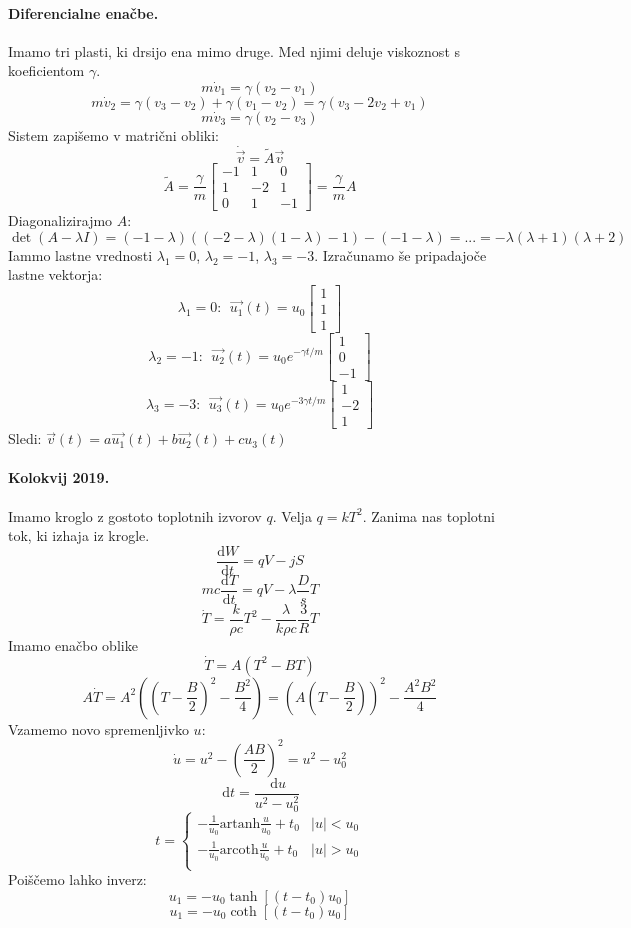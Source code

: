 \documentclass[a4paper]{article}
\newcommand{\vct}[1]{\overrightarrow{#1}}
\newcommand{\dif}{\,\mathrm{d}}
\newcommand{\dd}[2]{\frac{\mathrm{d} {#1}}{\mathrm{d} {#2}}}
\begin{document}
\paragraph{Diferencialne enačbe.} Imamo tri plasti, ki drsijo ena mimo druge. Med njimi deluje viskoznost s koeficientom $\gamma$.
$$m\dot{v}_1 = \gamma(v_2 - v_1)$$
$$m\dot{v}_2 = \gamma(v_3 - v_2) + \gamma (v_1 - v_2) = \gamma (v_3 - 2v_2 + v_1)$$
$$m\dot{v}_3 = \gamma(v_2 - v_3)$$
Sistem zapišemo v matrični obliki:
$$\dot{\vct{v}} = \tilde{A}\vct{v}$$
$$\tilde{A} = \frac{\gamma}{m} \begin{bmatrix}
    -1 & 1 & 0 \\
    1 & -2 & 1 \\
    0 & 1 & -1
\end{bmatrix} = \frac{\gamma}{m}A$$
Diagonalizirajmo $A$:
$$\det(A - \lambda I) = (-1 - \lambda)\left((- 2 - \lambda)(1 - \lambda) - 1\right) - (-1 - \lambda) = ... = -\lambda(\lambda + 1)(\lambda + 2)$$
Iammo lastne vrednosti $\lambda_1 = 0$, $\lambda_2 = -1$, $\lambda_3 = -3$. Izračunamo še pripadajoče lastne vektorja:
$$\lambda_1 = 0:~~\vct{u_1}(t) = u_0 \begin{bmatrix}
    1 \\ 1 \\ 1
\end{bmatrix}$$
$$\lambda_2 = -1:~~\vct{u_2}(t) = u_0 e^{-\gamma t/m}\begin{bmatrix}
    1 \\ 0 \\ -1
\end{bmatrix}$$
$$\lambda_3 = -3:~~\vct{u_3}(t) = u_0 e^{-3 \gamma t/m}\begin{bmatrix}
    1 \\ -2 \\ 1
\end{bmatrix}$$
Sledi: $\vct{v}(t) = a \vct{u_1}(t) + b\vct{u_2}(t) + c{u_3}(t)$
\paragraph{Kolokvij 2019.} Imamo kroglo z gostoto toplotnih izvorov $q$. Velja $q = kT^2$. Zanima nas toplotni tok, ki izhaja iz krogle.
$$\dd{W}{t} = qV - jS$$
$$mc\dd{T}{t} = qV - \lambda \frac{D}{s} T$$
$$\dot{T} = \frac{k}{\rho c} T^2 - \frac{\lambda}{k\rho c}\frac{3}{R} T$$
Imamo enačbo oblike $$\dot T = A(T^2 - BT)$$
$$A\dot T = A^2\left((T-\frac{B}{2})^2 - \frac{B^2}{4}\right) = \left(A\left(T - \frac{B}{2}\right)\right)^2 - \frac{A^2B^2}{4}$$
Vzamemo novo spremenljivko $u$:
$$\dot u  = u^2 - \left(\frac{AB}{2}\right)^2 = u^2 - u_0^2$$
$$\dif t = \frac{\dif u}{u^2 - u_0^2}$$
$$t = \begin{cases}
    -\frac{1}{u_0}\mathrm{artanh}\frac{u}{u_0} + t_0 & |u|<u_0 \\
    -\frac{1}{u_0}\mathrm{arcoth}\frac{u}{u_0} + t_0 & |u|>u_0 \\
\end{cases}$$
Poiščemo lahko inverz:
$$u_1 = -u_0\tanh\left[(t-t_0)u_0\right]$$
$$u_1 = -u_0\coth\left[(t-t_0)u_0\right]$$
\end{document}
